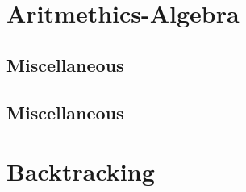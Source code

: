 \section{Aritmethics-Algebra}
\subsection{Miscellaneous}
\raggedbottom
\vspace{-.7\baselineskip}\hrulefill
\vspace{0.1\baselineskip}\subsection{Miscellaneous}
\raggedbottom
\vspace{-.7\baselineskip}\hrulefill
\vspace{0.1\baselineskip}
\section{Backtracking}

